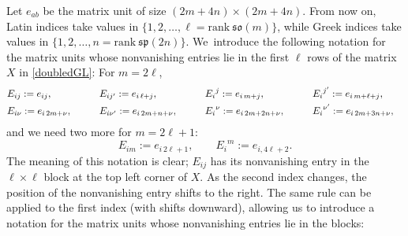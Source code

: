 \documentclass[10pt,a4paper]{amsart}
\numberwithin{equation}{section}
\theoremstyle{definition}
\def\so{\mathfrak{so}}
\def\sp{\mathfrak{sp}}
\begin{document}
Let $ e_{ab}$ be the matrix unit of size $(2m+4n)\times (2m+4n)$.
From now on, Latin indices take values in $\{ 1, 2, \dots, \ell= \mathrm{rank}\ \so(m) \}$, while Greek indices take values in $\{ 1, 2, \dots, n = \mathrm{rank}\ \sp(2n) \}$.
We~introduce the following notation for the matrix units whose nonvanishing entries lie in the first $\ell $ rows of the matrix $ X $ in \eqref{doubledGL}: For $ m = 2\ell$,
\begin{alignat*}{5}
	&E_{ij}:= e_{ij}, \qquad&& E_{ij'}:= e_{i\, \ell+j}, \qquad&& {E_i}^j:= e_{i\, m+j},\qquad&& {E_{i}}^{j'}:= e_{i\, m+\ell+j},&
	\notag\\
&	E_{i\nu}:=e_{i\, 2m+\nu}, \qquad && E_{i\nu'}:= e_{i\, 2m+n+\nu}, \qquad && {E_i}^{\nu}:= e_{i\, 2m+2n+\nu}, \qquad && {E_i}^{\nu'}:= e_{i\, 2m+3n+\nu},&
\end{alignat*}
and we need two more for $m = 2\ell+1$:
\begin{equation*}
	E_{im} := e_{i\, 2\ell+1}, \qquad {E_i}^m := e_{i,4\ell+2}.
\end{equation*}
The meaning of this notation is clear; $E_{ij}$ has its nonvanishing entry in the $\ell \times \ell$ block at the top left corner of $X$.
As the second index changes, the position of the nonvanishing entry shifts to the right.
The same rule can be applied to the first index (with shifts downward), allowing us to introduce a notation for the matrix units whose nonvanishing entries lie in the blocks: %
\end{document}
